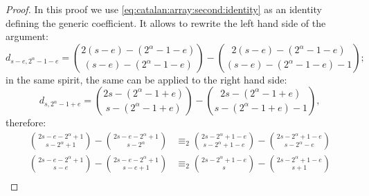 \begin{proof}
In this proof we use \autoref{eq:catalan:array:second:identity} as
an identity defining the generic coefficient. It allows to rewrite the left hand side
of the argument:
\begin{displaymath}
    d_{s-e,2^{{\alpha}}-1-e}= {{2(s-e)-(2^{{\alpha}}-1-e)}\choose{(s-e)-(2^{{\alpha}}-1-e)}}
        - {{2(s-e)-(2^{{\alpha}}-1-e)}\choose{(s-e)-(2^{{\alpha}}-1-e)-1}};
\end{displaymath}
in the same spirit, the same can be applied to the right hand side:
\begin{displaymath}
    d_{s,2^{{\alpha}}-1+e}={{2s-(2^{{\alpha}}-1+e)}\choose{s-(2^{{\alpha}}-1+e)}}
        - {{2s-(2^{{\alpha}}-1+e)}\choose{s-(2^{{\alpha}}-1+e)-1}},
\end{displaymath}
therefore:
\begin{displaymath}
    \begin{split}
        {{2s-e-2^{{\alpha}}+1}\choose{s-2^{{\alpha}}+1}}
            - {{2s-e-2^{{\alpha}}+1}\choose{s-2^{{\alpha}}}}
        &\equiv_{2}
        {{2s-2^{{\alpha}}+1-e}\choose{s-2^{{\alpha}}+1-e}}
            - {{2s-2^{{\alpha}}+1-e}\choose{s-2^{{\alpha}}-e}}\\
        {{2s-e-2^{{\alpha}}+1}\choose{s-e}}
            - {{2s-e-2^{{\alpha}}+1}\choose{s-e+1}}
        &\equiv_{2}
        {{2s-2^{{\alpha}}+1-e}\choose{s}}
            - {{2s-2^{{\alpha}}+1-e}\choose{s+1}}\\
    \end{split}
\end{displaymath}


\end{proof}

